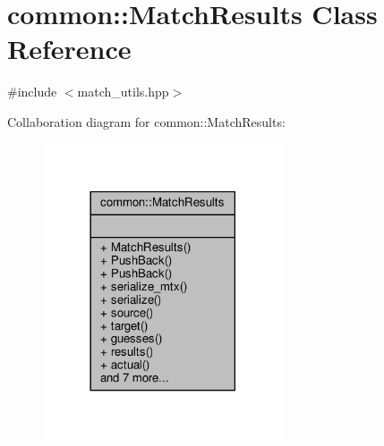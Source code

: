 \hypertarget{classcommon_1_1MatchResults}{}\section{common\+:\+:Match\+Results Class Reference}
\label{classcommon_1_1MatchResults}


{\ttfamily \#include $<$match\+\_\+utils.\+hpp$>$}



Collaboration diagram for common\+:\+:Match\+Results\+:\nopagebreak
\begin{figure}[H]
\begin{center}
\leavevmode
\includegraphics[width=201pt]{d5/d84/classcommon_1_1MatchResults__coll__graph}
\end{center}
\end{figure}
